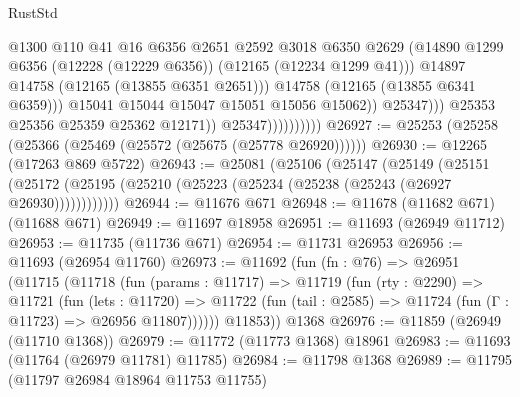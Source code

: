\begin{lexlean}{RustStd}
\begin{coremodule}
                                          @1300
                                          @110
                                          @41
                                          @16
                                          @6356
                                          @2651
                                          @2592
                                          @3018
                                          @6350
                                          @2629
                                          (@14890
                                            @1299
                                            @6356
                                            (@12228 (@12229 @6356))
                                            (@12165 (@12234 @1299 @41)))
                                          @14897
                                          @14758
                                          (@12165 (@13855 @6351 @2651)))
                                        @14758
                                        (@12165 (@13855 @6341 @6359)))
                                      @15041
                                      @15044
                                      @15047
                                      @15051
                                      @15056
                                      @15062))
                                  @25347)))
                            @25353
                            @25356
                            @25359
                            @25362
                            @12171))
                        @25347))))))))))
@26927 := @25253 (@25258 (@25366 (@25469 (@25572 (@25675 (@25778 @26920))))))
@26930 := @12265 (@17263 @869 @5722)
@26943 := @25081
    (@25106
      (@25147
        (@25149
          (@25151 (@25172 (@25195 (@25210 (@25223 (@25234 (@25238 (@25243 (@26927 @26930))))))))))))
@26944 := @11676 @671
@26948 := @11678 (@11682 @671) (@11688 @671)
@26949 := @11697 @18958
@26951 := @11693 (@26949 @11712)
@26953 := @11735 (@11736 @671)
@26954 := @11731 @26953
@26956 := @11693 (@26954 @11760)
@26973 := @11692
    (fun (fn : @76) =>
    @26951
      (@11715
        (@11718
          (fun (params : @11717) =>
          @11719
            (fun (rty : @2290) =>
            @11721
              (fun (lets : @11720) =>
              @11722 (fun (tail : @2585) => @11724 (fun (Γ : @11723) => @26956 @11807))))))
        @11853))
    @1368
@26976 := @11859 (@26949 (@11710 @1368))
@26979 := @11772 (@11773 @1368) @18961
@26983 := @11693 (@11764 (@26979 @11781) @11785)
@26984 := @11798 @1368
@26989 := @11795 (@11797 @26984 @18964 @11753 @11755)

\end{coremodule}
\end{lexlean}
